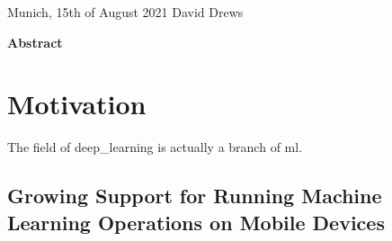 \documentclass[11pt,
               a4paper,
               bibtotoc,
               idxtotoc,
               headsepline,
               footsepline,
               footexclude,
               BCOR12mm,
               DIV13,
               openany,   %
               ]
               {scrbook}
\def\author{David Drews}
\def\date{15th of August 2021}
\begin{document}
\vspace{15mm}
\noindent
Munich, \date \hspace{5cm} \author
\cleardoubleemptypage


{}
\vspace*{2cm}
\begin{center}
    {\Large \bf Abstract}
\end{center}
\vspace{1cm}

\lipsum[2]

\cleardoublepage


\printglossary[type=\acronymtype,nonumberlist]
\cleardoublepage

\printglossary[nonumberlist]
\cleardoublepage


\tableofcontents
\thispagestyle{empty}
\cleardoubleemptypage


\mainmatter
\chapter{Motivation}

The field of \gls{deep_learning} is actually a branch of \acrfull{ml}.

\section{Growing Support for Running Machine Learning Operations on Mobile Devices}
\end{document}

